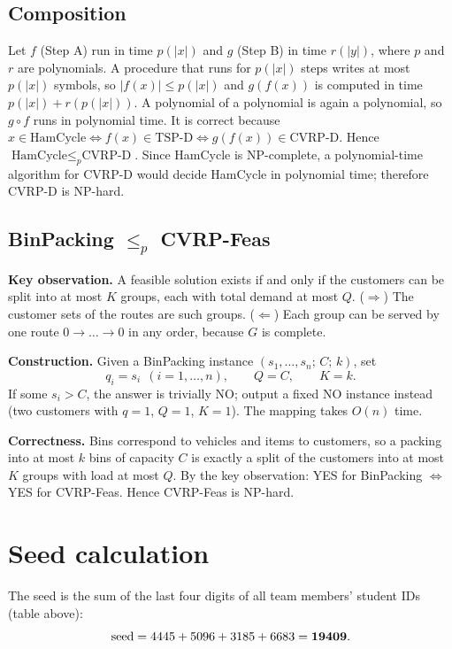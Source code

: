 \documentclass[11pt,a4paper]{article}
\newcommand{\cvrpd}{\mbox{CVRP-D}}
\newcommand{\tspd}{\mbox{TSP-D}}
\newcommand{\hc}{\mbox{HamCycle}}
\newcommand{\bp}{\mbox{BinPacking}}
\newcommand{\feas}{\mbox{CVRP-Feas}}
\begin{document}
\subsection{Composition}
Let $f$ (Step A) run in time $p(|x|)$ and $g$ (Step B) in time $r(|y|)$, where $p$ and $r$
are polynomials. A procedure that runs for $p(|x|)$ steps writes at most $p(|x|)$ symbols,
so $|f(x)|\le p(|x|)$ and $g(f(x))$ is computed in time $p(|x|)+r(p(|x|))$. A polynomial
of a polynomial is again a polynomial, so $g\circ f$ runs in polynomial time. It is
correct because $x\in\hc \iff f(x)\in\tspd \iff g(f(x))\in\cvrpd$. Hence
$\hc\le_p\cvrpd$. Since \hc{} is NP-complete, a polynomial-time algorithm for \cvrpd{}
would decide \hc{} in polynomial time; therefore \cvrpd{} is NP-hard.

\subsection{\texorpdfstring{\bp{} $\le_p$ \feas}{BinPacking to CVRP-Feas}}
\textbf{Key observation.} A feasible solution exists if and only if the customers can be
split into at most $K$ groups, each with total demand at most $Q$. ($\Rightarrow$) The
customer sets of the routes are such groups. ($\Leftarrow$) Each group can be served by
one route $0\to\dots\to0$ in any order, because $G$ is complete.

\textbf{Construction.} Given a \bp{} instance $(s_1,\dots,s_n;\,C;\,k)$, set
\[
q_i=s_i\ \ (i=1,\dots,n),\qquad Q=C,\qquad K=k .
\]
If some $s_i>C$, the answer is trivially NO; output a fixed NO instance instead (two
customers with $q=1$, $Q=1$, $K=1$). The mapping takes $O(n)$ time.

\textbf{Correctness.} Bins correspond to vehicles and items to customers, so a packing
into at most $k$ bins of capacity $C$ is exactly a split of the customers into at most
$K$ groups with load at most $Q$. By the key observation: YES for \bp{} $\iff$ YES for
\feas. Hence \feas{} is NP-hard.

\section{Seed calculation}
The seed is the sum of the last four digits of all team members' student IDs (table
above):
\[
\text{seed}=4445 + 5096 + 3185 + 6683=\mathbf{19409}.
\]
\end{document}
